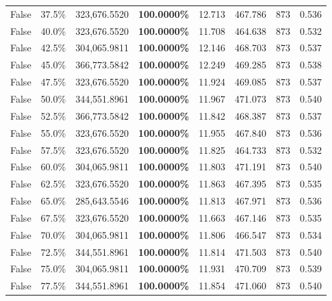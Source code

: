 \begin{table}[H]
{\begin{tabular}{lllrllll}
\cline{1-8}
False & 37.5\% & 323,676.5520 & \bfseries \color{red} 100.0000\% & 12.713 & 467.786 & 873 & 0.536 \\
\cline{1-8}
False & 40.0\% & 323,676.5520 & \bfseries \color{red} 100.0000\% & 11.708 & 464.638 & 873 & 0.532 \\
\cline{1-8}
False & 42.5\% & 304,065.9811 & \bfseries \color{red} 100.0000\% & 12.146 & 468.703 & 873 & 0.537 \\
\cline{1-8}
False & 45.0\% & 366,773.5842 & \bfseries \color{red} 100.0000\% & 12.249 & 469.285 & 873 & 0.538 \\
\cline{1-8}
False & 47.5\% & 323,676.5520 & \bfseries \color{red} 100.0000\% & 11.924 & 469.085 & 873 & 0.537 \\
\cline{1-8}
False & 50.0\% & 344,551.8961 & \bfseries \color{red} 100.0000\% & 11.967 & 471.073 & 873 & 0.540 \\
\cline{1-8}
False & 52.5\% & 366,773.5842 & \bfseries \color{red} 100.0000\% & 11.842 & 468.387 & 873 & 0.537 \\
\cline{1-8}
False & 55.0\% & 323,676.5520 & \bfseries \color{red} 100.0000\% & 11.955 & 467.840 & 873 & 0.536 \\
\cline{1-8}
False & 57.5\% & 323,676.5520 & \bfseries \color{red} 100.0000\% & 11.825 & 464.733 & 873 & 0.532 \\
\cline{1-8}
False & 60.0\% & 304,065.9811 & \bfseries \color{red} 100.0000\% & 11.803 & 471.191 & 873 & 0.540 \\
\cline{1-8}
False & 62.5\% & 323,676.5520 & \bfseries \color{red} 100.0000\% & 11.863 & 467.395 & 873 & 0.535 \\
\cline{1-8}
False & 65.0\% & 285,643.5546 & \bfseries \color{red} 100.0000\% & 11.813 & 467.971 & 873 & 0.536 \\
\cline{1-8}
False & 67.5\% & 323,676.5520 & \bfseries \color{red} 100.0000\% & 11.663 & 467.146 & 873 & 0.535 \\
\cline{1-8}
False & 70.0\% & 304,065.9811 & \bfseries \color{red} 100.0000\% & 11.806 & 466.547 & 873 & 0.534 \\
\cline{1-8}
False & 72.5\% & 344,551.8961 & \bfseries \color{red} 100.0000\% & 11.814 & 471.503 & 873 & 0.540 \\
\cline{1-8}
False & 75.0\% & 304,065.9811 & \bfseries \color{red} 100.0000\% & 11.931 & 470.709 & 873 & 0.539 \\
\cline{1-8}
False & 77.5\% & 344,551.8961 & \bfseries \color{red} 100.0000\% & 11.854 & 471.060 & 873 & 0.540 \\

\end{tabular}}
\end{table}
